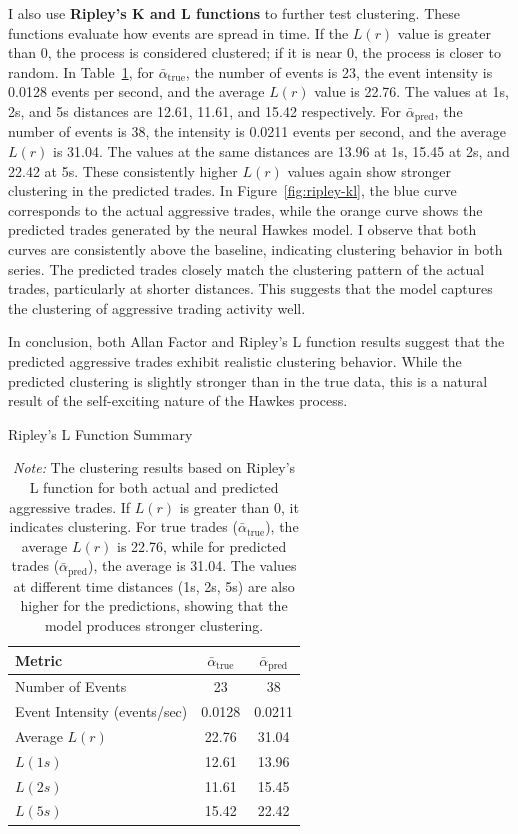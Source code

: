 I also use \textbf{Ripley's K and L functions} to further test clustering. These functions evaluate how events are spread in time. If the \( L(r) \) value is greater than 0, the process is considered clustered; if it is near 0, the process is closer to random. In Table~\ref{tb:ripley-l}, for $\bar{\alpha}_\text{true}$, the number of events is 23, the event intensity is 0.0128 events per second, and the average \( L(r) \) value is 22.76. The values at 1s, 2s, and 5s distances are 12.61, 11.61, and 15.42 respectively. For $\bar{\alpha}_\text{pred}$, the number of events is 38, the intensity is 0.0211 events per second, and the average \( L(r) \) is 31.04. The values at the same distances are 13.96 at 1s, 15.45 at 2s, and 22.42 at 5s. These consistently higher \( L(r) \) values again show stronger clustering in the predicted trades. In Figure~\ref{fig:ripley-kl}, the blue curve corresponds to the actual aggressive trades, while the orange curve shows the predicted trades generated by the neural Hawkes model. I observe that both curves are consistently above the baseline, indicating clustering behavior in both series. The predicted trades closely match the clustering pattern of the actual trades, particularly at shorter distances. This suggests that the model captures the clustering of aggressive trading activity well.

In conclusion, both Allan Factor and Ripley's L function results suggest that the predicted aggressive trades exhibit realistic clustering behavior. While the predicted clustering is slightly stronger than in the true data, this is a natural result of the self-exciting nature of the Hawkes process.

\begin{table}[tbp]
    \centering
    \caption{Ripley's L Function Summary}
    \caption*{\textit{Note:} The clustering results based on Ripley's L function for both actual and predicted aggressive trades. If \( L(r) \) is greater than 0, it indicates clustering. For true trades ($\bar{\alpha}_\text{true}$), the average \( L(r) \) is 22.76, while for predicted trades ($\bar{\alpha}_\text{pred}$), the average is 31.04. The values at different time distances (1s, 2s, 5s) are also higher for the predictions, showing that the model produces stronger clustering.}
    \label{tb:ripley-l}
    \begin{tabular}{lcc}
    \toprule
    \textbf{Metric} & $\bar{\alpha}_\text{true}$ & $\bar{\alpha}_\text{pred}$ \\
    \midrule
    Number of Events & 23 & 38 \\
    Event Intensity (events/sec) & 0.0128 & 0.0211 \\
    Average \( L(r) \) & 22.76 & 31.04 \\
    \( L(1s) \) & 12.61 & 13.96 \\
    \( L(2s) \) & 11.61 & 15.45 \\
    \( L(5s) \) & 15.42 & 22.42 \\
    \bottomrule
    \end{tabular}
\end{table}

